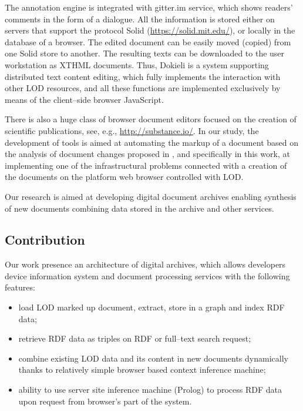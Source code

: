 \documentclass[12pt]{llncs}
\begin{document}
The annotation engine is integrated with gitter.im service, which shows readers' comments in the form of a dialogue. All the information is stored either on servers that support the protocol Solid (\url{https://solid.mit.edu/}), or locally in the database of a browser. The edited document can be easily moved (copied) from one Solid store to another. The resulting texts can be downloaded to the user workstation as XTHML documents. Thus, Dokieli is a system supporting distributed text content editing, which fully implements the interaction with other LOD resources, and all these functions are implemented exclusively by means of the client--side browser JavaScript.

There is also a huge class of browser document editors focused on the creation of scientific publications, see, e.g., \url{http://substance.io/}. In our study, the development of tools is aimed at automating the markup of a document based on the analysis of document changes proposed in \cite{b14}, and specifically in this work, at implementing one of the infrastructural problems connected with a creation of the documents on the platform web browser controlled with LOD.

Our research is aimed at developing digital document archives enabling
synthesis of new documents combining data stored in the archive and other
services.

\subsection{Contribution}
\label{sec:contr}

Our work presence an architecture of digital archives, which allows
developers device information system and document processing services
with the following features:
\begin{itemize}
\item load LOD marked up document, extract, store in a graph and index RDF data;
\item retrieve RDF data as triples on RDF or full--text search request;
\item combine existing LOD data and its content in new documents dynamically
  thanks to relatively simple browser based context inference machine;
\item ability to use server site inference machine (Prolog) to process RDF data upon
  request from browser's part of the system.
\end{itemize}
\end{document}
